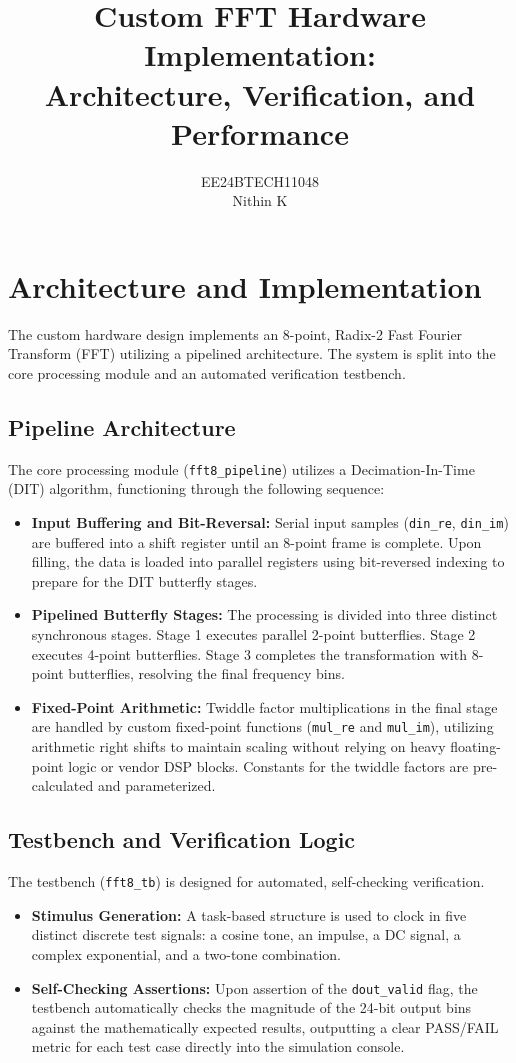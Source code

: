 \documentclass[11pt]{article}
\title{Custom FFT Hardware Implementation: \\ Architecture, Verification, and Performance}
\author{EE24BTECH11048\\Nithin K}
\date{}
\begin{document}
\maketitle

\section{Architecture and Implementation}
The custom hardware design implements an 8-point, Radix-2 Fast Fourier Transform (FFT) utilizing a pipelined architecture. The system is split into the core processing module and an automated verification testbench.

\subsection{Pipeline Architecture}
The core processing module (\texttt{fft8\_pipeline}) utilizes a Decimation-In-Time (DIT) algorithm, functioning through the following sequence:
\begin{itemize}
    \item \textbf{Input Buffering and Bit-Reversal:} Serial input samples (\texttt{din\_re}, \texttt{din\_im}) are buffered into a shift register until an 8-point frame is complete. Upon filling, the data is loaded into parallel registers using bit-reversed indexing to prepare for the DIT butterfly stages.
    \item \textbf{Pipelined Butterfly Stages:} The processing is divided into three distinct synchronous stages. Stage 1 executes parallel 2-point butterflies. Stage 2 executes 4-point butterflies. Stage 3 completes the transformation with 8-point butterflies, resolving the final frequency bins. 
    \item \textbf{Fixed-Point Arithmetic:} Twiddle factor multiplications in the final stage are handled by custom fixed-point functions (\texttt{mul\_re} and \texttt{mul\_im}), utilizing arithmetic right shifts to maintain scaling without relying on heavy floating-point logic or vendor DSP blocks. Constants for the twiddle factors are pre-calculated and parameterized.
\end{itemize}

\subsection{Testbench and Verification Logic}
The testbench (\texttt{fft8\_tb}) is designed for automated, self-checking verification. 
\begin{itemize}
    \item \textbf{Stimulus Generation:} A task-based structure is used to clock in five distinct discrete test signals: a cosine tone, an impulse, a DC signal, a complex exponential, and a two-tone combination.
    \item \textbf{Self-Checking Assertions:} Upon assertion of the \texttt{dout\_valid} flag, the testbench automatically checks the magnitude of the 24-bit output bins against the mathematically expected results, outputting a clear PASS/FAIL metric for each test case directly into the simulation console.
\end{itemize}
\end{document}
